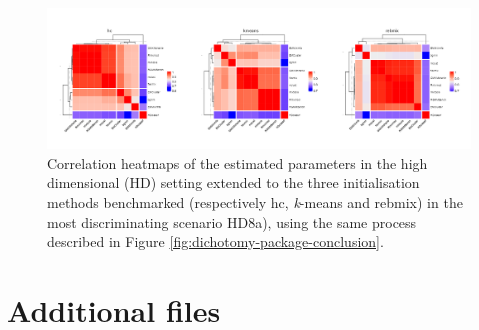 \begin{figure}

{\centering \includegraphics[width=0.8\linewidth]{./figs/HD/heatmap_global_HD} 

}

\caption{Correlation heatmaps of the estimated parameters in the high dimensional (HD) setting extended to the three initialisation methods benchmarked (respectively hc, \textit{k}-means and rebmix) in the most discriminating scenario HD8a), using the same process described in Figure \ref{fig:dichotomy-package-conclusion}.}\label{fig:heatmap-all-correlation-plots-HD}
\end{figure}

\newpage

\hypertarget{additional-files}{%
\section{Additional files}\label{additional-files}}

